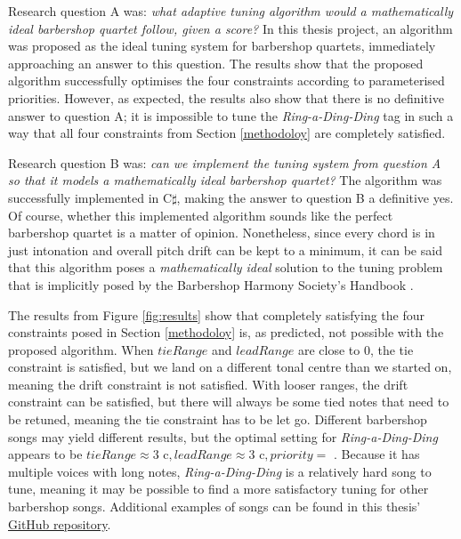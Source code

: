 \documentclass[a4paper]{article}
\begin{document}
Research question A was: {\it what adaptive tuning algorithm would a mathematically ideal barbershop quartet follow, given a score?} In this thesis project, an algorithm was proposed as the ideal tuning system for barbershop quartets, immediately approaching an answer to this question. The results show that the proposed algorithm successfully optimises the four constraints according to parameterised priorities. However, as expected, the results also show that there is no definitive answer to question A; it is impossible to tune the \textit{Ring-a-Ding-Ding} tag in such a way that all four constraints from Section \ref{methodoloy} are completely satisfied. 

Research question B was: {\it can we implement the tuning system from question A so that it models a mathematically ideal barbershop quartet?} The algorithm was successfully implemented in C$\sharp$, making the answer to question B a definitive yes. Of course, whether this implemented algorithm sounds like the perfect barbershop quartet is a matter of opinion. Nonetheless, since every chord is in just intonation and overall pitch drift can be kept to a minimum, it can be said that this algorithm poses a \textit{mathematically ideal} solution to the tuning problem that is implicitly posed by the Barbershop Harmony Society's Handbook \cite{barbershop_harmony_society_contest_2022}.

The results from Figure \ref{fig:results} show that completely satisfying the four constraints posed in Section \ref{methodoloy} is, as predicted, not possible with the proposed algorithm. When $\mathit{tieRange}$ and $\mathit{leadRange}$ are close to 0, the tie constraint is satisfied, but we land on a different tonal centre than we started on, meaning the drift constraint is not satisfied. With looser ranges, the drift constraint can be satisfied, but there will always be some tied notes that need to be retuned, meaning the tie constraint has to be let go. Different barbershop songs may yield different results, but the optimal setting for \textit{Ring-a-Ding-Ding} appears to be $\mathit{tieRange} \approx 3\text{ c}, \mathit{leadRange} \approx 3\text{ c}, \mathit{priority} = $ . Because it has multiple voices with long notes, \textit{Ring-a-Ding-Ding} is a relatively hard song to tune, meaning it may be possible to find a more satisfactory tuning for other barbershop songs. Additional examples of songs can be found in this thesis' \href{https://github.com/teuncb/adaptivebarbershop}{GitHub repository}.
\end{document}
